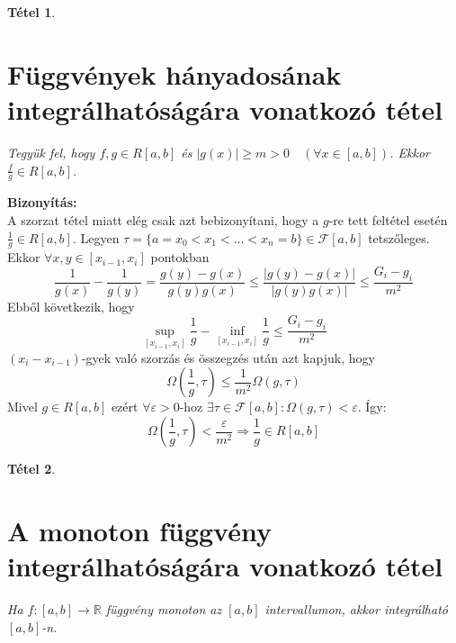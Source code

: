\documentclass{article}
\newtheorem{theorem}{Tétel}
\renewenvironment{proof}{\textbf{Bizonyítás:} \\}{\hfill}
\begin{document}
\newpage
\begin{theorem}
\section{Függvények hányadosának integrálhatóságára vonatkozó tétel }
Tegyük fel, hogy $f,g \in R[a,b]$ és $|g(x)|\geq m > 0\quad (\forall x \in [a,b])$. Ekkor $\frac{f}{g}\in R[a,b]$.
\end{theorem}
\begin{proof}
A szorzat tétel miatt elég csak azt bebizonyítani, hogy a $g$-re tett feltétel esetén $\frac{1}{g}\in R[a,b]$. Legyen $\tau = \{a =x_0 < x_1 < \dots < x_n = b\} \in \mathcal{F}[a,b]$ tetszőleges. Ekkor $\forall x,y \in [x_{i-1},x_i]$ pontokban
\begin{equation*}
    \frac{1}{g(x)} - \frac{1}{g(y)} = \frac{g(y) - g(x)}{g(y)g(x)} \leq \frac{|g(y) - g(x)|}{|g(y)g(x)|} \leq \frac{G_i-g_i}{m^2}        
\end{equation*}
Ebből következik, hogy
\begin{equation*}
    \sup_{[x_{i-1},x_i]} \frac{1}{g} - \inf_{[x_{i-1},x_i]} \frac{1}{g} \leq \frac{G_i-g_i}{m^2}
\end{equation*}
$(x_i-x_{i-1})$-gyek való szorzás és összegzés után azt kapjuk, hogy
\begin{equation*}
    \Omega\left(\frac{1}{g}, \tau\right) \leq \frac{1}{m^2} \Omega (g, \tau)
\end{equation*}
Mivel $g\in R[a,b]$ ezért $\forall \varepsilon > 0$-hoz $\exists \tau \in \mathcal{F}[a,b]: \Omega(g,\tau) < \varepsilon$. Így:
\begin{equation*}
    \Omega\left(\frac{1}{g}, \tau\right) < \frac{\varepsilon}{m^2} \Longrightarrow \frac{1}{g} \in R[a,b]
\end{equation*}
\end{proof}
\newpage
\begin{theorem}
\section{A monoton függvény integrálhatóságára vonatkozó tétel} 
Ha $f : [a,b] \to \mathbb{R}$ függvény monoton az $[a,b]$ intervallumon, akkor integrálható $[a,b]$-n.
\end{theorem}
\end{document}
